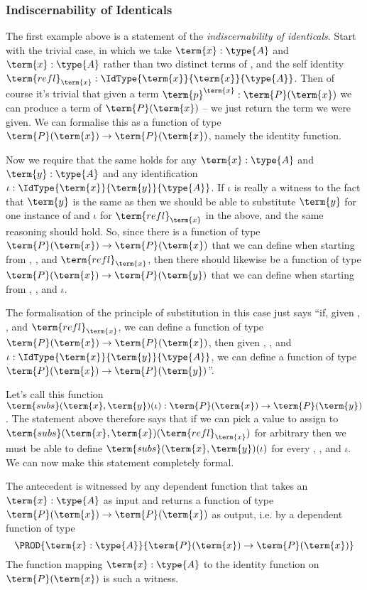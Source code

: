 \subsubsection{Indiscernability of Identicals}

The first example above is a statement of the \emph{indiscernability of identicals}.  
Start with the trivial case, in which we take $\term{x}:\type{A}$ and $\term{x}:\type{A}$ rather than two distinct terms of , and the self identity $\term{refl}_{\term{x}}:\IdType{\term{x}}{\term{x}}{\type{A}}$. 
Then of course it's trivial that given a term 
$\term{p}^{\term{x}}:\term{P}(\term{x})$
we can produce a term of 
$\term{P}(\term{x})$ -- we just return the term we were given.  We can formalise this as a function of type 
$\term{P}(\term{x}) \to \term{P}(\term{x})$, namely the identity function.


Now we require that the same holds for any $\term{x}:\type{A}$ and $\term{y}:\type{A}$ and any identification 
$\iota:\IdType{\term{x}}{\term{y}}{\type{A}}$.
If $\iota$ is really a witness to the fact that $\term{y}$ is the same as  then we should be able to substitute $\term{y}$ for one instance of  and $\iota$ for $\term{refl}_{\term{x}}$ in the above, and the same reasoning should hold.  So, since there is a function of type 
$\term{P}(\term{x}) \to \term{P}(\term{x})$ that we can define when starting from 
, , and $\term{refl}_{\term{x}}$, then there should likewise be a 
function of type 
$\term{P}(\term{x}) \to \term{P}(\term{y})$ that we can define when starting from 
, , and $\iota$.

The formalisation of the principle of substitution in this case just says ``if, 
given 
, , and $\term{refl}_{\term{x}}$, 
we can define a function of type 
$\term{P}(\term{x}) \to \term{P}(\term{x})$, then 
given 
, , and $\iota:\IdType{\term{x}}{\term{y}}{\type{A}}$, 
we can define a function of type 
$\term{P}(\term{x}) \to \term{P}(\term{y})$''.  

Let's call this function 
$\term{subs}(\term{x}, \term{y})(\iota):\term{P}(\term{x}) \to \term{P}(\term{y})$.
The statement above therefore says that if we can pick a value to assign to 
$\term{subs}(\term{x}, \term{x})(\term{refl}_{\term{x}})$ for arbitrary  then we must be able to define 
$\term{subs}(\term{x}, \term{y})(\iota)$ for every 
, , and $\iota$.  We can now make this statement completely formal.

The antecedent is witnessed by any dependent function that takes an $\term{x}:\type{A}$ as input and returns a function of type 
$\term{P}(\term{x}) \to \term{P}(\term{x})$ as output, i.e. by a dependent function of type
\[
\PROD{\term{x}:\type{A}}
{\term{P}(\term{x}) \to \term{P}(\term{x})}
\]
The function mapping $\term{x}:\type{A}$ to the identity function on 
$\term{P}(\term{x})$ is such a witness.

